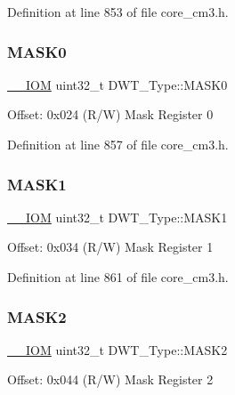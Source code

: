 Definition at line 853 of file core\+\_\+cm3.\+h.

\mbox{\label{struct_d_w_t___type_a821eb5e71f340ec077efc064cfc567db}} 
\subsubsection{\texorpdfstring{M\+A\+S\+K0}{MASK0}}
{\footnotesize\ttfamily \hyperlink{core__sc300_8h_ab6caba5853a60a17e8e04499b52bf691}{\+\_\+\+\_\+\+I\+OM} uint32\+\_\+t D\+W\+T\+\_\+\+Type\+::\+M\+A\+S\+K0}

Offset\+: 0x024 (R/W) Mask Register 0 

Definition at line 857 of file core\+\_\+cm3.\+h.

\mbox{\label{struct_d_w_t___type_aabf94936c9340e62fed836dcfb152405}} 
\subsubsection{\texorpdfstring{M\+A\+S\+K1}{MASK1}}
{\footnotesize\ttfamily \hyperlink{core__sc300_8h_ab6caba5853a60a17e8e04499b52bf691}{\+\_\+\+\_\+\+I\+OM} uint32\+\_\+t D\+W\+T\+\_\+\+Type\+::\+M\+A\+S\+K1}

Offset\+: 0x034 (R/W) Mask Register 1 

Definition at line 861 of file core\+\_\+cm3.\+h.

\mbox{\label{struct_d_w_t___type_a00ac4d830dfe0070a656cda9baed170f}} 
\subsubsection{\texorpdfstring{M\+A\+S\+K2}{MASK2}}
{\footnotesize\ttfamily \hyperlink{core__sc300_8h_ab6caba5853a60a17e8e04499b52bf691}{\+\_\+\+\_\+\+I\+OM} uint32\+\_\+t D\+W\+T\+\_\+\+Type\+::\+M\+A\+S\+K2}

Offset\+: 0x044 (R/W) Mask Register 2 

